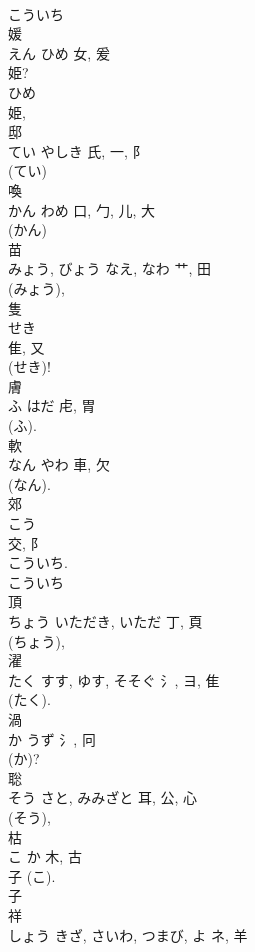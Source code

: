 \documentclass[8pt]{extreport}
\begin{document}
\begin{CJK}{UTF8}{min}
\\	こういち
\\	媛	
\\	えん	ひめ	女, 爰	
\\	姫? 
\\	ひめ 
\\	姫, 
\\	邸	
\\	てい	やしき	氏, 一, 阝	
\\	(てい) 
\\	喚	
\\	かん	わめ	口, 勹, 儿, 大	
\\	(かん) 
\\	苗	
\\	みょう, びょう	なえ, なわ	艹, 田	
\\	(みょう), 
\\	隻	
\\	せき	
\\	隹, 又	
\\	(せき)! 
\\	膚	
\\	ふ	はだ	虍, 胃	
\\	(ふ). 
\\	軟	
\\	なん	やわ	車, 欠	
\\	(なん). 
\\	郊	
\\	こう	
\\	交, 阝	
\\	こういち.
\\	こういち 
\\	頂	
\\	ちょう	いただき, いただ	丁, 頁	
\\	(ちょう), 
\\	濯	
\\	たく	すす, ゆす, そそぐ	氵, ヨ, 隹	
\\	(たく). 
\\	渦	
\\	か	うず	氵, 冋	
\\	(か)? 
\\	聡	
\\	そう	さと, みみざと	耳, 公, 心	
\\	(そう), 
\\	枯	
\\	こ	か	木, 古	
\\	子 (こ). 
\\	子 
\\	祥	
\\	しょう	きざ, さいわ, つまび, よ	ネ, 羊	

\end{CJK}
\end{document}
